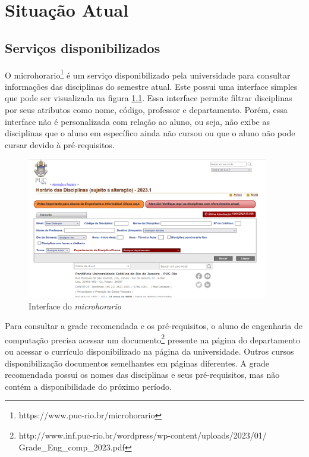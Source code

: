 
\chapter{Situa{\c c}\~ao Atual}
\label{cha:Situa{\c c}\~ao Atual}

\section{Serviços disponibilizados}

O microhorario\footnote{https://www.puc-rio.br/microhorario} é um serviço disponibilizado pela universidade para consultar informações das disciplinas do semestre atual. Este possui uma interface simples que pode ser visualizada na figura \ref{fig:microhorario}. Essa interface permite filtrar disciplinas por seus atributos como nome, código, professor e departamento. Porém, essa interface não é personalizada com relação ao aluno, ou seja, não exibe as disciplinas que o aluno em específico ainda não cursou ou que o aluno não pode cursar devido à pré-requisitos.

\begin{figure}[h]
    \begin{center}
    \includegraphics[width=300pt]{figuras/microhorario}
    \caption{Interface do \textit{microhorario}}
    \label{fig:microhorario}
    \end{center}
\end{figure}

Para consultar a grade recomendada e os pré-requisitos, o aluno de engenharia de computação precisa acessar um documento\footnote{http://www.inf.puc-rio.br/wordpress/wp-content/uploads/2023/01/\\Grade\_Eng\_comp\_2023.pdf} presente na página do departamento ou acessar o currículo disponibilizado na página da universidade. Outros cursos disponibilização documentos semelhantes em páginas diferentes. A grade recomendada possui os nomes das disciplinas e seus pré-requisitos, mas não contém a disponibilidade do próximo período.

